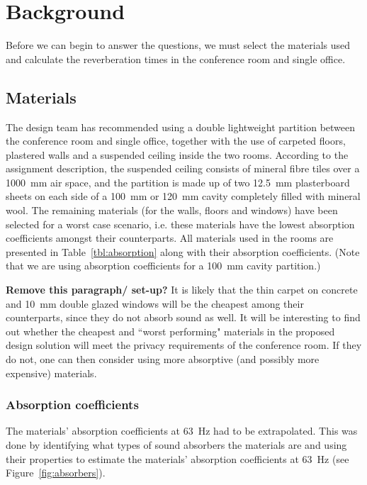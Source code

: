 \section{Background}

Before we can begin to answer the questions, we must select the materials used and calculate the reverberation times in the conference room and single office.



\subsection{Materials}

The design team has recommended using a double lightweight partition between the conference room and single office, together with the use of carpeted floors, plastered walls and a suspended ceiling inside the two rooms.
According to the assignment description, the suspended ceiling consists of mineral fibre tiles over a 1000~mm air space, and the partition is made up of two 12.5~mm plasterboard sheets on each side of a 100~mm or 120~mm cavity completely filled with mineral wool.
The remaining materials (for the walls, floors and windows) have been selected for a worst case scenario, i.e. these materials have the lowest absorption coefficients amongst their counterparts.
All materials used in the rooms are presented in Table~\ref{tbl:absorption} along with their absorption coefficients.
(Note that we are using absorption coefficients for a 100~mm cavity partition.)

\textbf{Remove this paragraph/ set-up?}
It is likely that the thin carpet on concrete and 10~mm double glazed windows will be the cheapest among their counterparts, since they do not absorb sound as well.
It will be interesting to find out whether the cheapest and ``worst performing" materials in the proposed design solution will meet the privacy requirements of the conference room.
If they do not, one can then consider using more absorptive (and possibly more expensive) materials.





\subsubsection{Absorption coefficients}

The materials' absorption coefficients at 63~Hz had to be extrapolated.
This was done by identifying what types of sound absorbers the materials are and using their properties to estimate the materials' absorption coefficients at 63~Hz (see Figure~\ref{fig:absorbers}).

